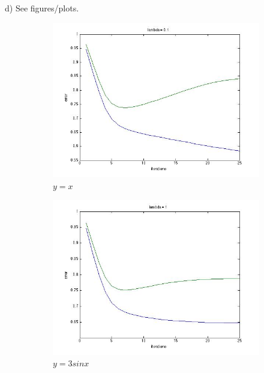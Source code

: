 \documentclass[12pt]{report}
\begin{document}
d) See figures/plots.

\begin{figure}
    \centering
    \begin{subfigure}[b]{0.3\textwidth}
        \centering
        \includegraphics[width=\textwidth]{l01.jpg}
        \caption{$y=x$}
        \label{fig:y equals x}
    \end{subfigure}
    \hfill
    \begin{subfigure}[b]{0.3\textwidth}
        \centering
        \includegraphics[width=\textwidth]{l1.jpg}
        \caption{$y=3sinx$}
        \label{fig:three sin x}
    \end{subfigure}
    \hfill
    \begin{subfigure}[b]{0.3\textwidth}

\end{subfigure}
\end{figure}
\end{document}
